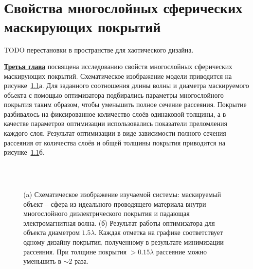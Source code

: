 \chapter{Свойства многослойных сферических маскирующих
  покрытий} \label{chapt3}

TODO перестановки в пространстве для хаотического дизайна.

\underline{\textbf{Третья глава}} посвящена исследованию свойств
многослойных сферических маскирующих покрытий. Схематическое
изображение модели приводится на рисунке~\ref{img:scattering}а. Для
заданного соотношения длины волны и диаметра маскируемого объекта с
помощью оптимизатора подбирались параметры многослойного покрытия
таким образом, чтобы уменьшить полное сечение рассеяния.  Покрытие
разбивалось на фиксированное количество слоёв одинаковой толщины, а в
качестве параметров оптимизации использовались показатели преломления
каждого слоя.  Результат оптимизации в виде зависимости полного
сечения рассеяния от количества слоёв и общей толщины покрытия
приводится на рисунке~\ref{img:scattering}б.
\begin{figure}[t]
  \begin{minipage}[ht]{0.45\linewidth}        
  \end{minipage}
  \hfill
  \begin{minipage}[ht]{0.54\linewidth}
  \end{minipage}\\
  \vspace{0.3em}\\
  \begin{minipage}[ht]{0.45\linewidth}        
  \end{minipage}
  \hfill
  \begin{minipage}[ht]{0.54\linewidth}
  \end{minipage}

  \caption{(a) Схематическое изображение изучаемой системы: маскируемый
    объект -- сфера из идеального проводящего материала внутри
    многослойного диэлектрического покрытия и падающая
    электромагнитная волна. (б) 
    Результат работы оптимизатора для объекта диаметром $1.5\lambda$.
    Каждая отметка на графике соответствует одному дизайну покрытия,
    полученному в результате минимизации рассеяния. При толщине
    покрытия $>0.15\lambda$ рассеяние можно уменьшить в $\sim 2$
    раза.}
  \label{img:scattering}  
\end{figure}
